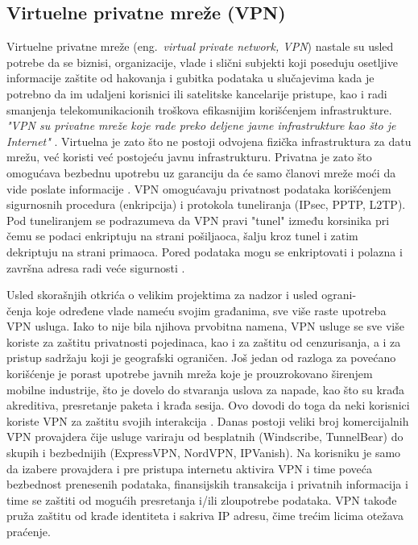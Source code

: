 \documentclass[a4paper]{article}
\begin{document}
\subsection{Virtuelne privatne mreže (VPN)}
\label{subsec:vpn}

Virtuelne privatne mreže (eng.~{\em virtual private network, VPN}) nastale su usled potrebe da se biznisi, organizacije, vlade i slični subjekti koji poseduju osetljive informacije zaštite od hakovanja i gubitka podataka u slučajevima kada je potrebno da im udaljeni korisnici ili satelitske kancelarije pristupe, kao i radi smanjenja telekomunikacionih troškova efikasnijim korišćenjem infrastrukture.\textit{ "VPN su privatne mreže koje rade preko deljene javne infrastrukture kao što je Internet"} \cite{vpn2}. Virtuelna je zato što ne postoji odvojena fizička infrastruktura za datu mrežu, već koristi već postojeću javnu infrastrukturu. Privatna je zato što  omogućava bezbednu upotrebu uz garanciju da će samo članovi mreže moći da vide poslate informacije \cite{vpn3}. VPN omogućavaju privatnost podataka korišćenjem sigurnosnih procedura (enkripcija) i protokola tuneliranja (IPsec, PPTP, L2TP). Pod tuneliranjem se podrazumeva da VPN pravi "tunel"  između korsinika pri čemu se podaci enkriptuju na strani pošiljaoca, šalju kroz tunel i zatim dekriptuju na strani primaoca. Pored podataka mogu se enkriptovati i polazna i završna adresa radi veće sigurnosti \cite{vpn4}. 
\par Usled skorašnjih otkrića o velikim projektima za nadzor i usled ograni-\\čenja koje određene vlade nameću svojim građanima, sve više raste upotreba VPN usluga. Iako to nije bila njihova prvobitna namena, VPN usluge se sve više koriste za zaštitu privatnosti pojedinaca, kao i za zaštitu od cenzurisanja, a i za pristup sadržaju koji je geografski ograničen. Još jedan od razloga za povećano korišćenje je porast upotrebe javnih mreža koje je prouzrokovano širenjem mobilne industrije, što je dovelo do stvaranja uslova za napade, kao što su krađa akreditiva, presretanje paketa i krađa sesija. Ovo dovodi do toga da neki korisnici koriste VPN za zaštitu svojih interakcija \cite{vpn5}. Danas postoji veliki broj komercijalnih VPN provajdera čije usluge variraju od besplatnih (Windscribe, TunnelBear) do skupih i bezbednijih (ExpressVPN, NordVPN, IPVanish). Na korisniku je samo da izabere provajdera i pre pristupa internetu aktivira VPN i time poveća bezbednost prenesenih podataka, finansijskih transakcija i privatnih informacija i time se zaštiti od mogućih presretanja i/ili zloupotrebe podataka. VPN takođe pruža zaštitu od krađe identiteta i sakriva IP adresu, čime trećim licima otežava praćenje. 
\end{document}
